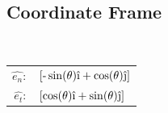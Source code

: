 \documentclass[12pt]{report}
\begin{document}
\begin{flushleft}
\section{Coordinate Frame}

    \begin{minipage}[c]{.5\textwidth}
      \center
      
      \vspace{2ex}
    \end{minipage}%
    \begin{minipage}[c]{.5\textwidth}
      \center
       \\
      \begin{tabular}{rl}
        $\hat{e_n}:$ & $\left[\textrm{-}\sin(\theta)\hat{\textrm{\i}}+\cos(\theta)\hat{\textrm{\j}}\right]$ \\
        $\hat{e_t}:$ & $\left[\cos(\theta)\hat{\textrm{\i}}+\sin(\theta)\hat{\textrm{\j}}\right]$ \\
      \end{tabular}
    \end{minipage}

\newpage


\end{flushleft}
\end{document}
